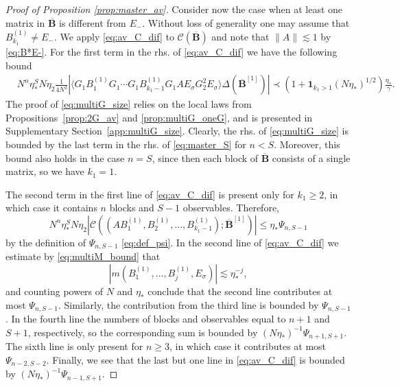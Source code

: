 \documentclass[10pt]{amsart}
\numberwithin{equation}{section}
\begin{document}
\begin{proof}[Proof of Proposition \ref{prop:master_av}]
Consider now the case when at least one matrix in $\overline{\bm{B}}$ is different from $E_-$. Without loss of generality one may assume that $B^{(1)}_{k_1}\neq E_-$. We apply \eqref{eq:av_C_dif} to $\mathcal{C}\left(\overline{\bm{B}}\right)$ and note that $\|A\|\lesssim 1$ by \eqref{eq:B*E-}. For the first term in the rhs. of \eqref{eq:av_C_dif} we have the following bound
\begin{equation}
\begin{split}
&N^n\eta^S_* N\eta_2 \frac{1}{4N^2}\left\vert\langle G_1B_1^{(1)}G_1\cdots G_1B_{k_1-1}^{(1)}G_1AE_\sigma G_2^2 E_\sigma\rangle\Delta\left(\overline{\bm{B}}^{[1]}\right)\right\vert\prec \left(1+\bm{1}_{k_1>1}(N\eta_*)^{1/2}\right)\frac{\eta_*}{\gamma}.
\end{split}
\label{eq:multiG_size}
\end{equation}
The proof of \eqref{eq:multiG_size} relies on the local laws from Propositions~\ref{prop:2G_av} and \ref{prop:multiG_oneG}, and is presented in Supplementary Section~\ref{app:multiG_size}. Clearly, the rhs. of \eqref{eq:multiG_size} is bounded by the last term in the rhs. of \eqref{eq:master_S} for $n<S$. Moreover, this bound also holds in the case $n=S$, since then each block of $\overline{\bm{B}}$ consists of a single matrix, so we have $k_1=1$.



The second term in the first line of \eqref{eq:av_C_dif} is present only for $k_1\ge 2$, in which case it contains $n$ blocks and $S-1$ observables. Therefore,
\begin{equation*}
N^n\eta_*^SN\eta_2\left\vert\mathcal{C}\left(\left(AB_1^{(1)},B_2^{(1)},\ldots,B_{k_1-1}^{(1)}\right); \overline{\bm{B}}^{[1]}\right)\right\vert\le \eta_*\Psi_{n,S-1}
\end{equation*}
by the definition of $\Psi_{n,S-1}$ \eqref{eq:def_psi}. In the second line of \eqref{eq:av_C_dif} we estimate by \eqref{eq:multiM_bound} that
\begin{equation*}
\left\vert m\left(B_1^{(1)},\ldots, B_j^{(1)}, E_\sigma\right)\right\vert \lesssim \eta^{-j}_*,
\end{equation*}
and counting powers of $N$ and $\eta_*$ conclude that the second line contributes at most $\Psi_{n,S-1}$. Similarly, the contribution from the third line is bounded by $\Psi_{n,S-1}$. In the fourth line the numbers of blocks and observables equal to $n+1$ and $S+1$, respectively, so the corresponding sum is bounded by $(N\eta_*)^{-1}\Psi_{n+1,S+1}$.  The sixth line is only present for $n\ge 3$, in which case it contributes at most $\Psi_{n-2,S-2}$. Finally, we see that the last but one line in \eqref{eq:av_C_dif} is bounded by $(N\eta_*)^{-1}\Psi_{n-1,S+1}$.


\end{proof}
\end{document}
